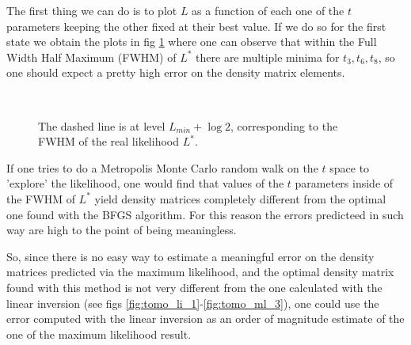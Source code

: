 \documentclass[a4paper, 11pt]{article}
\begin{document}
        The first thing we can do is to plot $L$ as a function of each one of the $t$ parameters keeping the other fixed at their best value.
        If we do so for the first state we obtain the plots in fig \ref{fig:tomo_ml_1_t} where one can observe that within the Full Width Half Maximum (FWHM) of $L^*$ there are multiple minima for $t_3, t_6, t_8$, so one should expect a pretty high error on the density matrix elements.

        \begin{figure}[H]
          \centering
          \\
          \caption{The dashed line is at level $L_{min} + \log{2}$, corresponding to the FWHM of the real likelihood $L^*$.}
          \label{fig:tomo_ml_1_t}
        \end{figure}

        If one tries to do a Metropolis Monte Carlo random walk on the $t$ space to 'explore' the likelihood, one would find that values of the $t$ parameters inside of the FWHM of $L^*$ yield density matrices completely different from the optimal one found with the BFGS algorithm. For this reason the errors predicteed in such way are high to the point of being meaningless.

        So, since there is no easy way to estimate a meaningful error on the density matrices predicted via the maximum likelihood, and the optimal density matrix found with this method is not very different from the one calculated with the linear inversion (see figs \ref{fig:tomo_li_1}-\ref{fig:tomo_ml_3}), one could use the error computed with the linear inversion as an order of magnitude estimate of the one of the maximum likelihood result.
\end{document}
